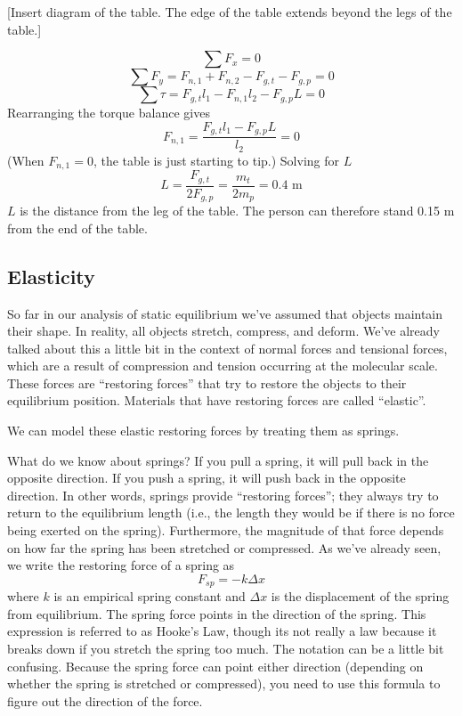 [Insert diagram of the table. The edge of the table extends beyond the legs of the table.]
\vspace{5cm}

$$\sum F_x = 0$$
$$\sum F_y = F_{n,1}+F_{n,2}-F_{g,t}-F_{g,p}=0$$
$$\sum \tau = F_{g,t}l_1-F_{n,1}l_2-F_{g,p}L=0$$
Rearranging the torque balance gives
$$F_{n,1}=\frac{F_{g,t}l_1-F_{g,p}L}{l_2}=0$$
(When $F_{n,1}=0$, the table is just starting to tip.) Solving for $L$
$$L=\frac{F_{g,t}}{2F_{g,p}}=\frac{m_t}{2m_p}=0.4\mbox{ m}$$
$L$ is the distance from the leg of the table. The person can therefore stand 0.15 m from the end of the table.

\subsection{Elasticity}
So far in our analysis of static equilibrium we've assumed that objects maintain their shape. In reality, all objects stretch, compress, and deform. We've already talked about this a little bit in the context of normal forces and tensional forces, which are a result of compression and tension occurring at the molecular scale. These forces are ``restoring forces'' that try to restore the objects to their equilibrium position. Materials that have restoring forces are called ``elastic''. 

We can model these elastic restoring forces by treating them as springs.

What do we know about springs? If you pull a spring, it will pull back in the opposite direction. If you push a spring, it will push back in the opposite direction. In other words, springs provide ``restoring forces''; they always try to return to the equilibrium length (i.e., the length they would be if there is no force being exerted on the spring). Furthermore, the magnitude of that force depends on how far the spring has been stretched or compressed. As we've already seen, we write the restoring force of a spring as
$$\boxed{F_{sp}=-k\Delta{x}}$$
where $k$ is an empirical spring constant and $\Delta{x}$ is the displacement of the spring from equilibrium. The spring force points in the direction of the spring. This expression is referred to as Hooke's Law, though its not really a law because it breaks down if you stretch the spring too much. The notation can be a little bit confusing. Because the spring force can point either direction (depending on whether the spring is stretched or compressed), you need to use this formula to figure out the direction of the force.

